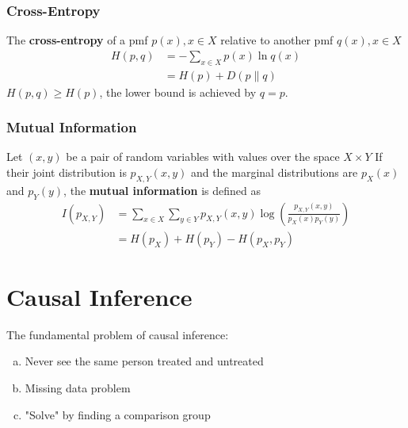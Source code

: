 \documentclass[11pt]{elegantbook}
\begin{document}
\subsection{Cross-Entropy}
\begin{definition}
    The \textbf{cross-entropy} of a pmf $p(x),x\in X$ relative to another pmf $q(x), x\in X$
    \begin{equation}
        \begin{aligned}
            H(p, q)&=-\sum_{x\in X}p(x)\ln q(x)\\&=H(p)+D(p\| q)
        \end{aligned}
        \nonumber
    \end{equation}
    $H(p,q)\geq H(p)$, the lower bound is achieved by $q=p$.
\end{definition}

\subsection{Mutual Information}
\begin{definition}
    Let $(x,y)$ be a pair of random variables with values over the space $X\times Y$ If their joint distribution is $p_{X,Y}(x,y)$ and the marginal distributions are $p_X(x)$ and $p_Y(y)$, the \textbf{mutual information} is defined as
    \begin{equation}
        \begin{aligned}
            I(p_{X,Y})&=\sum_{x\in X}\sum_{y\in Y}p_{X,Y}(x,y)\log\left(\frac{p_{X,Y}(x,y)}{p_X(x)p_Y(y)}\right)\\
            &=H(p_X)+H(p_Y)-H(p_X,p_Y)
        \end{aligned}
        \nonumber
    \end{equation}
\end{definition}

\chapter{Causal Inference}
The fundamental problem of causal inference:
\begin{enumerate}[(a).]
    \item Never see the same person treated and untreated
    \item Missing data problem
    \item "Solve" by finding a comparison group
\end{enumerate}
\end{document}
